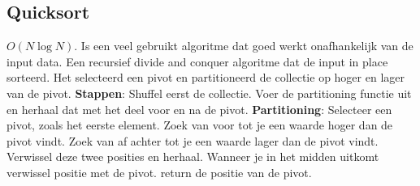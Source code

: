 \subsection{Quicksort}
$O(N\log N)$.
Is een veel gebruikt algoritme dat goed werkt onafhankelijk van de input data.
Een recursief divide and conquer algoritme dat de input in place sorteerd.
Het selecteerd een pivot en partitioneerd de collectie op hoger en lager van de pivot.
\textbf{Stappen}: Shuffel eerst de collectie.
Voer de partitioning functie uit en herhaal dat met het deel voor en na de pivot.
\textbf{Partitioning}:
Selecteer een pivot, zoals het eerste element.
Zoek van voor tot je een waarde hoger dan de pivot vindt.
Zoek van af achter tot je een waarde lager dan de pivot vindt.
Verwissel deze twee posities en herhaal.
Wanneer je in het midden uitkomt verwissel positie met de pivot.
return de positie van de pivot.
